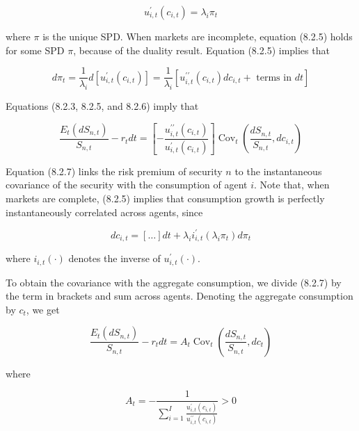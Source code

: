 \documentclass[\topdir/lecture\_notes.tex]{subfiles}
\begin{document}
\begin{equation}
u_{i, t}^{\prime}\left(c_{i, t}\right)=\lambda_{i} \pi_{t} \label{eq:8.2.5}
\end{equation}

where $\pi$ is the unique SPD. When markets are incomplete, equation (8.2.5) holds for some SPD $\pi$, because of the duality result. Equation (8.2.5) implies that

\begin{equation}
d \pi_{t}=\frac{1}{\lambda_{i}} d\left[u_{i, t}^{\prime}\left(c_{i, t}\right)\right]=\frac{1}{\lambda_{i}}\left[u_{i, t}^{\prime \prime}\left(c_{i, t}\right) d c_{i, t}+\text { terms in } d t\right] \label{eq:8.2.6}
\end{equation}

Equations (8.2.3, 8.2.5, and 8.2.6) imply that

\begin{equation}
\frac{E_{t}\left(d S_{n, t}\right)}{S_{n, t}}-r_{t} d t=\left[-\frac{u_{i, t}^{\prime \prime}\left(c_{i, t}\right)}{u_{i, t}^{\prime}\left(c_{i, t}\right)}\right] \operatorname{Cov}_{t}\left(\frac{d S_{n, t}}{S_{n, t}}, d c_{i, t}\right) \label{eq:8.2.7}
\end{equation}

Equation (8.2.7) links the risk premium of security $n$ to the instantaneous covariance of the security with the consumption of agent $i$. Note that, when markets are complete, (8.2.5) implies that consumption growth is perfectly instantaneously correlated across agents, since

\begin{equation}
d c_{i, t}=[\ldots] d t+\lambda_{i} i_{i, t}^{\prime}\left(\lambda_{i} \pi_{t}\right) d \pi_{t}
\end{equation}

where $i_{i, t}(\cdot)$ denotes the inverse of $u_{i, t}^{\prime}(\cdot)$.

To obtain the covariance with the aggregate consumption, we divide (8.2.7) by the term in brackets and sum across agents. Denoting the aggregate consumption by $c_{t}$, we get

\begin{equation}
\frac{E_{t}\left(d S_{n, t}\right)}{S_{n, t}}-r_{t} d t=A_{t} \operatorname{Cov}_{t}\left(\frac{d S_{n, t}}{S_{n, t}}, d c_{t}\right) \label{eq:8.2.8}
\end{equation}

where

\begin{equation}
A_{t}=-\frac{1}{\sum_{i=1}^{I} \frac{u_{i, t}^{\prime}\left(c_{i, t}\right)}{u_{i, t}^{\prime \prime}\left(c_{i, t}\right)}}>0
\end{equation}
\end{document}
